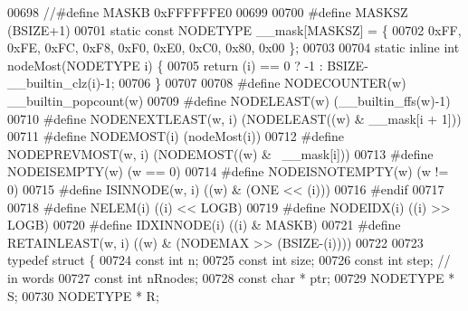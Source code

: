 \begin{DoxyCode}
00698 \textcolor{preprocessor}{//#define MASKB 0xFFFFFFE0}
00699 
00700 \textcolor{preprocessor}{#define MASKSZ (BSIZE+1)                                        }
00701 \textcolor{preprocessor}{static const NODETYPE \_\_mask[MASKSZ] = \{ }
00702 \textcolor{preprocessor}{                0xFF, 0xFE, 0xFC, 0xF8, 0xF0, 0xE0, 0xC0, 0x80, 0x00 \};}
00703 
00704 \textcolor{keyword}{static} \textcolor{keyword}{inline} \textcolor{keywordtype}{int} nodeMost(NODETYPE i) \{
00705         \textcolor{keywordflow}{return} (i) == 0 ? -1 : BSIZE-\_\_builtin\_clz(i)-1;
00706 \}
00707 
00708 \textcolor{preprocessor}{#define NODECOUNTER(w) \_\_builtin\_popcount(w)                                            }
00709 \textcolor{preprocessor}{#define NODELEAST(w) (\_\_builtin\_ffs(w)-1)                                                       }
00710 \textcolor{preprocessor}{#define NODENEXTLEAST(w, i) (NODELEAST((w) & \_\_mask[i + 1]))            }
00711 \textcolor{preprocessor}{#define NODEMOST(i) (nodeMost(i))                                                                       }
00712 \textcolor{preprocessor}{#define NODEPREVMOST(w, i) (NODEMOST((w) & ~\_\_mask[i]))                         }
00713 \textcolor{preprocessor}{#define NODEISEMPTY(w) (w == 0)}
00714 \textcolor{preprocessor}{#define NODEISNOTEMPTY(w) (w != 0)}
00715 \textcolor{preprocessor}{#define ISINNODE(w, i) ((w) & (ONE << (i)))                                                     }
00716 \textcolor{preprocessor}{#endif}
00717 
00718 \textcolor{preprocessor}{#define NELEM(i) ((i) << LOGB)                                                                          }
00719 \textcolor{preprocessor}{#define NODEIDX(i) ((i) >> LOGB)                                                                        }
00720 \textcolor{preprocessor}{#define IDXINNODE(i) ((i) & MASKB)                                                                      }
00721 \textcolor{preprocessor}{#define RETAINLEAST(w, i) ((w) & (NODEMAX >> (BSIZE-(i))))                      }
00722 \textcolor{preprocessor}{}
00723 \textcolor{keyword}{typedef} \textcolor{keyword}{struct }\{
00724         \textcolor{keyword}{const} \textcolor{keywordtype}{int} n;
00725         \textcolor{keyword}{const} \textcolor{keywordtype}{int} size;
00726         \textcolor{keyword}{const} \textcolor{keywordtype}{int} step;  \textcolor{comment}{// in words}
00727         \textcolor{keyword}{const} \textcolor{keywordtype}{int} nRnodes;
00728         \textcolor{keyword}{const} \textcolor{keywordtype}{char} * ptr;               
00729         NODETYPE * S;   
00730         NODETYPE * R;   

\end{DoxyCode}
